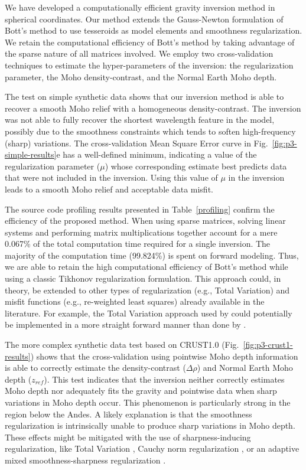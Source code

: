 We have developed a computationally efficient gravity inversion method in
spherical coordinates.
Our method extends the Gauss-Newton formulation of Bott's method
\citep{silva2014} to use tesseroids as model elements and smoothness
regularization.
We retain the computational efficiency of Bott's method by taking advantage of
the sparse nature of all matrices involved.
We employ two cross-validation techniques to estimate the hyper-parameters of
the inversion: the regularization parameter, the Moho density-contrast, and the
Normal Earth Moho depth.

The test on simple synthetic data shows that our inversion method is able to
recover a smooth Moho relief with a homogeneous density-contrast.
The inversion was not able to fully recover the shortest wavelength feature in
the model, possibly due to the smoothness constraints which tends to soften
high-frequency (sharp) variations.
The cross-validation Mean Square Error curve in Fig.~\ref{fig:p3-simple-results}e
has a well-defined minimum, indicating a value of the regularization parameter
($\mu$) whose corresponding estimate best predicts data that were not included
in the inversion.
Using this value of $\mu$ in the inversion leads to a smooth Moho relief and
acceptable data misfit.

The source code profiling results presented in Table~\ref{profiling}
confirm the efficiency of the proposed method.
When using sparse matrices, solving linear systems and performing matrix
multiplications together account for a mere 0.067\% of the total computation
time required for a single inversion.
The majority of the computation time (99.824\%) is spent on forward modeling.
Thus, we are able to retain the high computational efficiency of Bott's method
while using a classic Tikhonov regularization formulation.
This approach could, in theory, be extended to other types of regularization
(e.g., Total Variation) and misfit functions (e.g., re-weighted least squares)
already available in the literature.
For example, the Total Variation approach used by \citet{martins2011} could
potentially be implemented in a more straight forward manner than done by
\citet{santos2015}.

The more complex synthetic data test based on CRUST1.0
(Fig.~\ref{fig:p3-crust1-results})
shows that the cross-validation using pointwise Moho depth information
is able to correctly estimate the density-contrast ($\Delta\rho$) and Normal
Earth Moho depth ($z_{ref}$).
This test indicates that the inversion neither correctly estimates Moho depth
nor adequately fits the gravity and pointwise data when sharp variations in
Moho depth occur.
This phenomenon is particularly strong in the region below the Andes.
A likely explanation is that the smoothness regularization
is intrinsically unable to produce sharp variations in Moho depth.
These effects might be mitigated with the use of sharpness-inducing
regularization, like Total Variation \citep{martins2011},
Cauchy norm regularization \citep{sacchi1996, pilkington2008},
or an adaptive mixed smoothness-sharpness regularization \citep{sun2014}.

